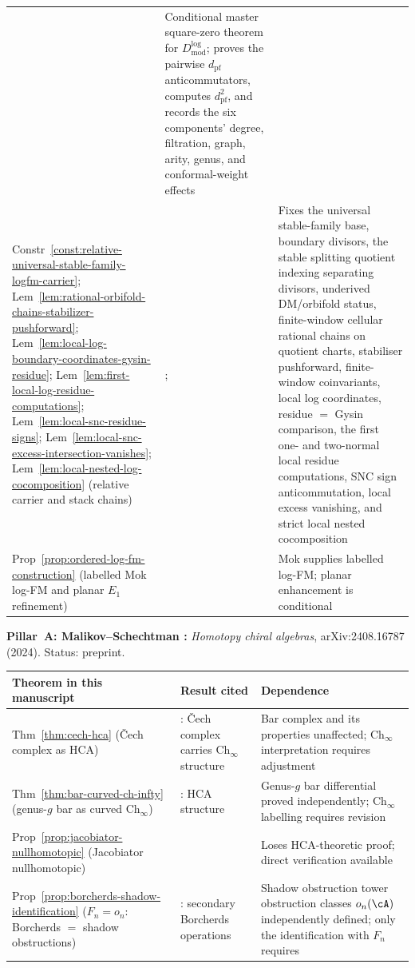 \begin{remark}
\begin{tabular}{p{4.8cm}p{4.2cm}p{5.5cm}}
 & Conditional master square-zero theorem for
 $D^{\log}_{\mathrm{mod}}$; proves the pairwise
 $d_{\mathrm{pf}}$ anticommutators, computes $d_{\mathrm{pf}}^2$, and
 records the six components' degree, filtration, graph, arity, genus,
 and conformal-weight effects \\
Constr~\ref{const:relative-universal-stable-family-logfm-carrier};
Lem~\ref{lem:rational-orbifold-chains-stabilizer-pushforward};
Lem~\ref{lem:local-log-boundary-coordinates-gysin-residue};
Lem~\ref{lem:first-local-log-residue-computations};
Lem~\ref{lem:local-snc-residue-signs};
Lem~\ref{lem:local-snc-excess-intersection-vanishes};
Lem~\ref{lem:local-nested-log-cocomposition}
 (relative carrier and stack chains)
 & \cite{DeligneM69,Knudsen83}; \cite[Thm~3.3.1, Cor~5.3.4]{Mok25}
 & Fixes the universal stable-family base, boundary divisors,
 the stable splitting quotient indexing separating divisors,
 underived DM/orbifold status, finite-window cellular rational chains
 on quotient charts, stabiliser pushforward, finite-window
 coinvariants, local log coordinates,
 residue $=$ Gysin comparison, the first one- and two-normal local
 residue computations, SNC sign anticommutation, local excess vanishing,
 and strict local nested cocomposition \\
Prop~\ref{prop:ordered-log-fm-construction}
 (labelled Mok log-FM and planar $E_1$ refinement)
 & \cite[Thm~3.3.1]{Mok25}
 & Mok supplies labelled log-FM; planar enhancement is conditional
\end{tabular}

\medskip
\noindent\textbf{Pillar~A: Malikov--Schechtman \cite{MS24}:}
\emph{Homotopy chiral algebras}, arXiv:2408.16787 (2024).
Status: preprint.

\smallskip
\renewcommand{\arraystretch}{1.25}
\noindent
\begin{tabular}{p{4.8cm}p{4.2cm}p{5.5cm}}
\textbf{Theorem in this manuscript}
 & \textbf{Result cited}
 & \textbf{Dependence} \\
\hline
Thm~\ref{thm:cech-hca}
 (\v{C}ech complex as HCA)
 & \cite[Thm~3.1]{MS24}: \v{C}ech complex carries
 $\mathrm{Ch}_\infty$ structure
 & Bar complex and its properties unaffected;
 $\mathrm{Ch}_\infty$ interpretation requires
 adjustment \\
Thm~\ref{thm:bar-curved-ch-infty}
 (genus-$g$ bar as curved $\mathrm{Ch}_\infty$)
 & \cite{MS24}: HCA structure
 & Genus-$g$ bar differential proved independently;
 $\mathrm{Ch}_\infty$ labelling requires revision \\
Prop~\ref{prop:jacobiator-nullhomotopic}
 (Jacobiator nullhomotopic)
 & \cite[\S4.1]{MS24}
 & Loses HCA-theoretic proof; direct verification
 available \\
Prop~\ref{prop:borcherds-shadow-identification}
 ($F_n = o_n$: Borcherds $=$ shadow obstructions)
 & \cite[\S4.5, eq.~(4.5.1)]{MS24}: secondary
 Borcherds operations
 & Shadow obstruction tower obstruction classes $o_n(\cA)$
 independently defined; only the identification
 with $F_n$ requires \cite{MS24}
\end{tabular}


\end{remark}
